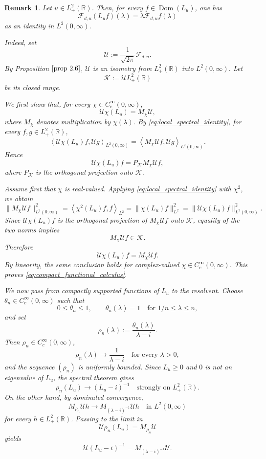 \documentclass[10pt]{article}
\newtheorem{remark}[theorem]{Remark}
\numberwithin{equation}{section}
\numberwithin{theorem}{section}
\begin{document}
\begin{remark}
\label{remark 2.14}
Let \(u\in L^{2}_+(\mathbb R)\). Then, for every
\(f\in \operatorname{Dom}(L_u)\), one has
\[
\mathcal F_{d,u}(L_u f)(\lambda)
=
\lambda \mathcal F_{d,u}f(\lambda)
\]
as an identity in \(L^2(0,\infty)\).

Indeed, set
\[
\mathcal U:=\frac{1}{\sqrt{2\pi}}\mathcal F_{d,u}.
\]
By Proposition \(\ref{prop 2.6}\), \(\mathcal U\) is an isometry from
\(L^2_+(\mathbb R)\) into \(L^2(0,\infty)\). Let
\[
\mathcal K:=\mathcal U L^2_+(\mathbb R)
\]
be its closed range.

We first show that, for every \(\chi\in C_c^\infty(0,\infty)\),
\begin{equation}
\label{eq:compact_functional_calculus}
\mathcal U\chi(L_u)=M_\chi\mathcal U,
\end{equation}
where \(M_\chi\) denotes multiplication by \(\chi(\lambda)\). By
\eqref{eq:local_spectral_identity}, for every \(f,g\in L^2_+(\mathbb R)\),
\[
\left\langle
\mathcal U\chi(L_u)f,\mathcal Ug
\right\rangle_{L^2(0,\infty)}
=
\left\langle
M_\chi\mathcal Uf,\mathcal Ug
\right\rangle_{L^2(0,\infty)}.
\]
Hence
\[
\mathcal U\chi(L_u)f
=
P_{\mathcal K}M_\chi\mathcal Uf,
\]
where \(P_{\mathcal K}\) is the orthogonal projection onto \(\mathcal K\).

Assume first that \(\chi\) is real-valued. Applying
\eqref{eq:local_spectral_identity} with \(\chi^2\), we obtain
\[
\|M_\chi\mathcal Uf\|_{L^2(0,\infty)}^2
=
\left\langle \chi^2(L_u)f,f\right\rangle_{L^2}
=
\|\chi(L_u)f\|_{L^2}^2
=
\|\mathcal U\chi(L_u)f\|_{L^2(0,\infty)}^2 .
\]
Since \(\mathcal U\chi(L_u)f\) is the orthogonal projection of
\(M_\chi\mathcal Uf\) onto \(\mathcal K\), equality of the two norms implies
\[
M_\chi\mathcal Uf\in\mathcal K.
\]
Therefore
\[
\mathcal U\chi(L_u)f
=
M_\chi\mathcal Uf.
\]
By linearity, the same conclusion holds for complex-valued
\(\chi\in C_c^\infty(0,\infty)\). This proves
\eqref{eq:compact_functional_calculus}.

We now pass from compactly supported functions of \(L_u\) to the resolvent.
Choose \(\theta_n\in C_c^\infty(0,\infty)\) such that
\[
0\leq \theta_n\leq1,
\qquad
\theta_n(\lambda)=1\quad\text{for }1/n\leq\lambda\leq n,
\]
and set
\[
\rho_n(\lambda):=\frac{\theta_n(\lambda)}{\lambda-i}.
\]
Then \(\rho_n\in C_c^\infty(0,\infty)\),
\[
\rho_n(\lambda)\to\frac1{\lambda-i}
\quad\text{for every }\lambda>0,
\]
and the sequence \((\rho_n)\) is uniformly bounded. Since \(L_u\ge0\) and
\(0\) is not an eigenvalue of \(L_u\), the spectral theorem gives
\[
\rho_n(L_u)\to (L_u-i)^{-1}
\quad\text{strongly on }L^2_+(\mathbb R).
\]
On the other hand, by dominated convergence,
\[
M_{\rho_n}\mathcal Uh
\to
M_{(\lambda-i)^{-1}}\mathcal Uh
\quad\text{in }L^2(0,\infty)
\]
for every \(h\in L^2_+(\mathbb R)\). Passing to the limit in
\[
\mathcal U\rho_n(L_u)=M_{\rho_n}\mathcal U
\]
yields
\begin{equation}
\label{eq:resolvent_intertwining}
\mathcal U(L_u-i)^{-1}
=
M_{(\lambda-i)^{-1}}\mathcal U.
\end{equation}


\end{remark}
\end{document}
